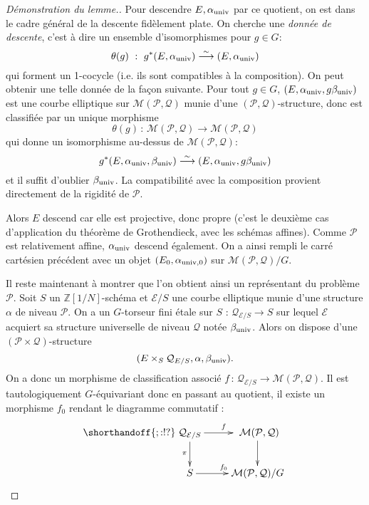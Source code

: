 \documentclass[11pt,a4paper]{article}
\newcommand{\Z}{\mathbb{Z}}
\newcommand{\E}{\mathcal{E}}
\renewcommand{\Pr}{\mathcal{P}}
\newcommand{\Qr}{\mathcal{Q}}
\newcommand{\M}{\mathcal{M}}
\newcommand{\vers}{\longrightarrow}
\newcommand{\de}{\,:\,}
\theoremstyle{definition}
\begin{document}
\begin{proof}[Démonstration du lemme.]
Pour descendre $E, \alpha_{\mathrm{univ}}$ par ce quotient, on est dans le cadre général de la descente fidèlement plate. On cherche une \emph{donnée de descente}, c'est à dire un ensemble d'isomorphismes pour $g\in G$:
$$\theta(g)\ :\ g^*(E, \alpha_{\univ}) \overset{\sim}{\vers} (E, \alpha_{\univ})$$
qui forment un 1-cocycle (i.e. ils sont compatibles à la composition). On peut obtenir une telle donnée de la façon suivante. Pour tout $g\in G$, $(E, \alpha_{\mathrm{univ}}, g\beta_{\mathrm{univ}})$ est une courbe elliptique sur $\M(\Pr, \Qr)$ munie d'une $(\Pr,\Qr)$-structure, donc est classifiée par un unique morphisme
$$\theta(g) \de \M(\Pr,\Qr)\vers \M(\Pr,\Qr)$$
qui donne un isomorphisme au-dessus de $\M(\Pr,\Qr)$:
$$g^*(E, \alpha_\univ, \beta_\univ) \overset{\sim}{\vers} (E, \alpha_\univ, g\beta_\univ)$$
et il suffit d'oublier $\beta_{\mathrm{univ}}$. La compatibilité avec la composition provient directement de la rigidité de $\Pr$.

Alors $E$ descend car elle est projective, donc propre (c'est le deuxième cas d'application du théorème de Grothendieck, avec les schémas affines). Comme $\Pr$ est relativement affine, $\alpha_{\mathrm{univ}}$ descend également. On a ainsi rempli le carré cartésien précédent avec un objet $(E_0,\alpha_{\mathrm{univ}, 0})$ sur $\M(\Pr,\Qr)/G$.

Il reste maintenant à montrer que l'on obtient ainsi un représentant du problème $\Pr$. Soit $S$ un $\Z[1/N]$-schéma et $\E/S$ une courbe elliptique munie d'une structure $\alpha$ de niveau $\Pr$. On a un $G$-torseur fini étale sur $S$ : $\Qr_{\E/S}\vers S$ sur lequel $\E$ acquiert sa structure universelle de niveau $\Qr$ notée $\beta_{\mathrm{univ}}$. Alors on dispose d'une $(\Pr\times\Qr)$-structure
$$(E\times_S \Qr_{E/S}, \alpha, \beta_\univ).$$
On a donc un morphisme de classification associé $f \de \Qr_{\E/S}\vers \M(\Pr,\Qr)$. Il est tautologiquement $G$-équivariant donc en passant au quotient, il existe un morphisme $f_0$ rendant le diagramme commutatif :
$$
\shorthandoff{;:!?}
\xymatrix {
\Qr_{\E/S} \ar[d]_\pi \ar[r]^f &\ \M(\Pr,\Qr) \ar[d] \\
 S \ar[r]^{f_0} & \M(\Pr,\Qr)/G
}
$$


\end{proof}
\end{document}

